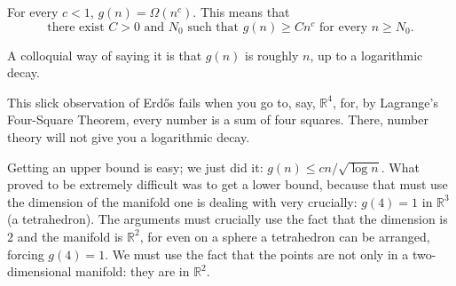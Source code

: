 \documentclass[11pt,a4paper]{article}
\begin{document}
\setcounter{theorem}{2}\begin{conjecture}
For every $c<1$, $g(n)=\Omega(n^c)$. This means that
\[
 \text{there exist $C>0$ and $N_0$ such that }g(n)\geq Cn^c
 \text{ for every }n\geq N_0.
\]
\end{conjecture}
A colloquial way of saying it is that $g(n)$ is roughly $n$, up to a
logarithmic decay.
\begin{remark}
This slick observation of Erd\H{o}s fails when you go to, say, $\mathbb R^4$,
for, by Lagrange's Four-Square Theorem, every number is a sum of four
squares. There, number theory will not give you a logarithmic decay.
\end{remark}
Getting an upper bound is easy; we just did it:
$g(n)\le cn/\sqrt{\log n}$. What proved to be extremely difficult was to
get a lower bound, because that must use the dimension of the manifold
one is dealing with very crucially: $g(4)=1$ in $\mathbb R^3$ (a tetrahedron).
The arguments must crucially use the fact that the dimension is $2$ and
the manifold is $\mathbb R^2$, for even on a sphere a tetrahedron can be
arranged, forcing $g(4)=1$. We must use the fact that the points are not
only in a two-dimensional manifold: they are in $\mathbb R^2$.
\end{document}
